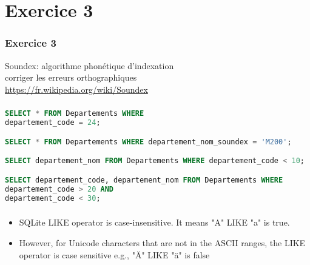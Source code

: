 \documentclass[svgnames,11pt]{beamer}
\begin{document}
\section{Exercice 3}
\begin{frame}
    \frametitle{Exercice 3}

    \begin{center}
        Soundex: algorithme phonétique d'indexation\\
        corriger les erreurs orthographiques\\
        \url{https://fr.wikipedia.org/wiki/Soundex}
    \end{center}

\end{frame}
\begin{frame}[fragile]
    \frametitle{}

\begin{center}
\begin{lstlisting}[language=SQL , basicstyle=\ttfamily\small, xleftmargin=1em, xrightmargin=0em]
SELECT * FROM Departements WHERE 
departement_code = 24;

SELECT * FROM Departements WHERE departement_nom_soundex = 'M200';

SELECT departement_nom FROM Departements WHERE departement_code < 10;

SELECT departement_code, departement_nom FROM Departements WHERE 
departement_code > 20 AND 
departement_code < 30;
\end{lstlisting}
\end{center}    

\end{frame}
\begin{frame}
    \frametitle{}

    \begin{aretenir}[Remarque]
        \begin{itemize}
            \item SQLite LIKE operator is case-insensitive. It means "A" LIKE "a" is true.
            \item However, for Unicode characters that are not in the ASCII ranges, the LIKE operator is case sensitive e.g., "Ä" LIKE "ä" is false
        \end{itemize}
    \end{aretenir}

\end{frame}
\end{document}
